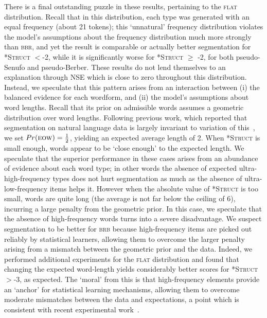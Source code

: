 \documentclass[11pt]{article}
\begin{document}
There is a final outstanding puzzle in these results, pertaining to the \textsc{flat} distribution. Recall that in this distribution, each type was generated with an equal frequency (about 21 tokens); this `unnatural' frequency distribution violates the model's assumptions about the frequency distribution much more strongly than \textsc{bbr}, and yet the result is comparable or actually better segmentation for \textsc{*Struct} $<$-2, while it is significantly worse for \textsc{*Struct} $\geq$ -2, for both pseudo-Senufo and pseudo-Berber. These results do not lend themselves to an explanation through NSE which is close to zero throughout this distribution. Instead, we speculate that this pattern arises from an interaction between (i) the balanced evidence for each wordform, and (ii) the model's assumptions about word lengths. Recall that its prior on admissible words assumes a geometric distribution over word lengths. Following previous work, which reported that segmentation on natural language data is largely invariant to variation of this~\cite{Goldwater09a}, we set $Pr(\textsc{eow}) = \frac{1}{2}$, yielding an expected average length of 2. When \textsc{*Struct} is small enough, words appear to be `close enough' to the expected length. We speculate that the superior performance in these cases arises from an abundance of evidence about each word type; in other words the absence of expected ultra-high-frequency types does not hurt segmentation as much as the absence of ultra-low-frequency items helps it. However when the absolute value of \textsc{*Struct} is too small, words are quite long (the average is not far below the ceiling of 6), incurring a large penalty from the geometric prior. In this case, we speculate that the absence of high-frequency words turns into a severe disadvantage. We suspect segmentation to be better for \textsc{brb} because high-frequency items are picked out reliably by statistical learners, allowing them to overcome the larger penalty arising from a mismatch between the geometric prior and the data. Indeed, we performed additional experiments for the \textsc{flat} distribution and found that changing the expected word-length yields considerably better scores for \textsc{*Struct}$>$-3, as expected.%
 The `moral' from this is that high-frequency elements provide an `anchor' for statistical learning mechanisms, allowing them to overcome moderate mismatches between the data and expectations, a point which is consistent with recent experimental work~\cite{Kurumada13a}.
\end{document}

